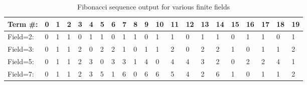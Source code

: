 \documentclass[a4paper]{article}
\theoremstyle{definition}
\begin{document}
\begin{table}[!ht]
\begin{tabular}{|l|l|l|l|l|l|l|l|l|l|l|l|l|l|l|l|l|l|l|l|l|}
\hline
Term \#: & 0 & 1 & 2 & 3 & 4 & 5 & 6 & 7 & 8 & 9 & 10 & 11 & 12 & 13 & 14 & 15 & 16 & 17 & 18 & 19 \\ \hline
Field=2: & 0 & 1 & 1 & 0 & 1 & 1 & 0 & 1 & 1 & 0 & 1  & 1  & 0  & 1  & 1  & 0  & 1  & 1  & 0  & 1  \\ \hline
Field=3: & 0 & 1 & 1 & 2 & 0 & 2 & 2 & 1 & 0 & 1 & 1  & 2  & 0  & 2  & 2  & 1  & 0  & 1  & 1  & 2  \\ \hline
Field=5: & 0 & 1 & 1 & 2 & 3 & 0 & 3 & 3 & 1 & 4 & 0  & 4  & 4  & 3  & 2  & 0  & 2  & 2  & 4  & 1  \\ \hline
Field=7: & 0 & 1 & 1 & 2 & 3 & 5 & 1 & 6 & 0 & 6 & 6  & 5  & 4  & 2  & 6  & 1  & 0  & 1  & 1  & 2  \\ \hline
\end{tabular}
\caption{Fibonacci sequence output for various finite fields}
\label{tab:fib-out}
\end{table}
\end{document}

